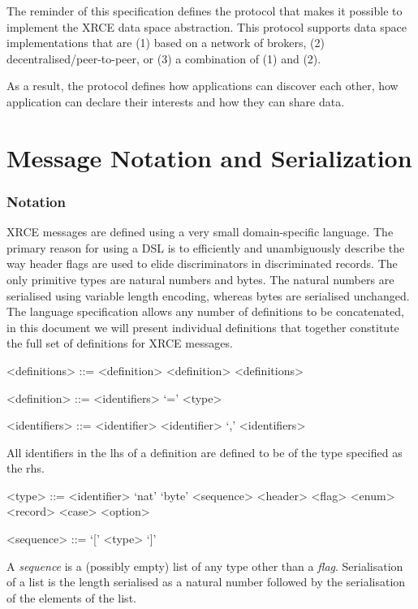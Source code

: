 \documentclass[a4paper,oneside,article]{memoir}
\begin{document}
The reminder of this specification defines the protocol that makes it possible to implement the XRCE
data space abstraction.  This protocol supports data space implementations that are (1) based on a
network of brokers, (2) decentralised/peer-to-peer, or (3) a combination of (1) and (2).

As a result, the protocol defines how applications can discover each other, how application can
declare their interests and how they can share data.

\chapter{Message Notation and Serialization}

\subsection{Notation}

XRCE messages are defined using a very small domain-specific language.  The primary reason for using
a DSL is to efficiently and unambiguously describe the way header flags are used to elide
discriminators in discriminated records.  The only primitive types are natural numbers and
bytes. The natural numbers are serialised using variable length encoding, whereas bytes are
serialised unchanged.  The language specification allows any number of definitions to be
concatenated, in this document we will present individual definitions that together constitute the
full set of definitions for XRCE messages.

\begin{grammar}
  <definitions> ::= <definition> \alt <definition> <definitions>
  
  <definition> ::= <identifiers> `=' <type>

  <identifiers> ::= <identifier> \alt <identifier> `,' <identifiers>
\end{grammar}

All identifiers in the lhs of a definition are defined to be of the type specified as the rhs.

\begin{grammar}
  <type> ::= <identifier> \alt `nat' \alt `byte' \alt <sequence> \alt <header> \alt <flag> \alt <enum> \alt <record> \alt <case> \alt <option>

  <sequence> ::= `[' <type> `]'
\end{grammar}

A \emph{sequence} is a (possibly empty) list of any type other than a \emph{flag}. Serialisation of
a list is the length serialised as a natural number followed by the serialisation of the elements of
the list.
\end{document}
